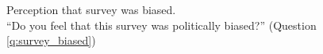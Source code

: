\begin{figure}[h!] 
    \caption[Perception that survey was biased]{Perception that survey was biased. \\ ``Do you feel that this survey was politically biased?'' (Question \ref{q:survey_biased})}\label{fig:survey_biased}
\end{figure}

